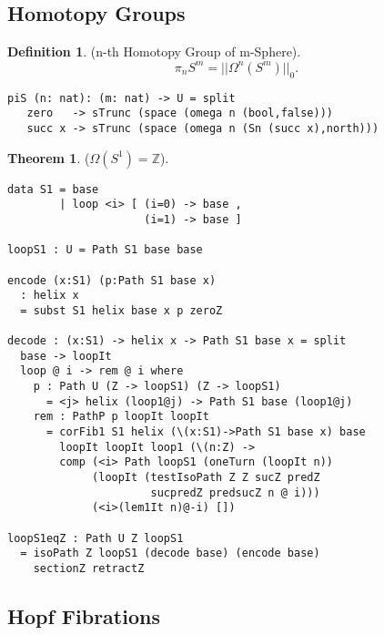 \documentclass{article}
\theoremstyle{definition}
\newtheorem{definition}{Definition}
\newtheorem{theorem}{Theorem}
\begin{document}
\newpage
\subsection{Homotopy Groups}

\begin{definition} (n-th Homotopy Group of m-Sphere).
$$\pi_{n}S^{m} = ||\Omega^{n}(S^{m})||_0.$$
\begin{lstlisting}
piS (n: nat): (m: nat) -> U = split
   zero   -> sTrunc (space (omega n (bool,false)))
   succ x -> sTrunc (space (omega n (Sn (succ x),north)))
\end{lstlisting}
\end{definition}

\begin{theorem} ($\Omega(S^1)=\mathbb{Z}$).
\begin{lstlisting}
data S1 = base
        | loop <i> [ (i=0) -> base ,
                     (i=1) -> base ]

loopS1 : U = Path S1 base base

encode (x:S1) (p:Path S1 base x)
  : helix x
  = subst S1 helix base x p zeroZ

decode : (x:S1) -> helix x -> Path S1 base x = split
  base -> loopIt
  loop @ i -> rem @ i where
    p : Path U (Z -> loopS1) (Z -> loopS1)
      = <j> helix (loop1@j) -> Path S1 base (loop1@j)
    rem : PathP p loopIt loopIt
      = corFib1 S1 helix (\(x:S1)->Path S1 base x) base
        loopIt loopIt loop1 (\(n:Z) ->
        comp (<i> Path loopS1 (oneTurn (loopIt n))
             (loopIt (testIsoPath Z Z sucZ predZ
                      sucpredZ predsucZ n @ i)))
             (<i>(lem1It n)@-i) [])

loopS1eqZ : Path U Z loopS1
  = isoPath Z loopS1 (decode base) (encode base)
    sectionZ retractZ
\end{lstlisting}
\end{theorem}

\newpage
\subsection{Hopf Fibrations}
\end{document}
